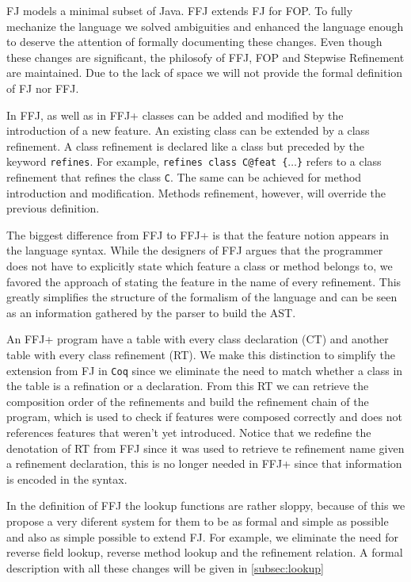 \ac{FJ} models a minimal subset of Java. \ac{FFJ} extends \ac{FJ} for \ac{FOP}.
To fully mechanize the language we solved ambiguities and enhanced the language enough
to deserve the attention of formally documenting these changes. 
Even though these changes are significant, the philosofy of \ac{FFJ}, \ac{FOP} and Stepwise Refinement are maintained.
Due to the lack of space we will not provide the formal definition of \ac{FJ} nor \ac{FFJ}.

In \ac{FFJ}, as well as in \ac{FFJ+} classes can be added and modified by the introduction of a new feature.
An existing class can be extended by a class refinement. A class refinement is declared like a class but
preceded by the keyword \texttt{refines}. For example, \texttt{refines class C@feat \{$\dots$\}} refers to a class refinement that
refines the class \texttt{C}. The same can be achieved for method introduction and modification. Methods refinement,
however, will override the previous definition.

The biggest difference from \ac{FFJ} to \ac{FFJ+} is that the feature notion appears in the language syntax.
While the designers of \ac{FFJ} argues that the programmer does not have to explicitly state which
feature a class or method belongs to, we favored the approach of stating the feature in the name of every refinement.
This greatly simplifies the structure of the formalism of the language and can be seen as an information gathered
by the parser to build the AST.

An \ac{FFJ+} program have a table with every class declaration (\textsf{CT}) and another table with every class refinement (\textsf{RT}).
We make this distinction to simplify the extension from \ac{FJ} in \texttt{Coq} since we eliminate the need
to match whether a class in the table is a refination or a declaration. From this \textsf{RT} we can retrieve the composition order
of the refinements and build the refinement chain of the program, which is used to check if features were composed correctly and
does not references features that weren't yet introduced. Notice that we redefine the denotation of \textsf{RT} from \ac{FFJ}
since it was used to retrieve te refinement name given a refinement declaration, this is no longer needed in \ac{FFJ+} since
that information is encoded in the syntax.

In the definition of \ac{FFJ} the lookup functions are rather sloppy, because of this we propose a very diferent system
for them to be as formal and simple as possible and also as simple possible to extend \ac{FJ}. 
For example, we eliminate the need for reverse field lookup, reverse method lookup and the refinement relation.
A formal description with all these changes will be given in \ref{subsec:lookup}


